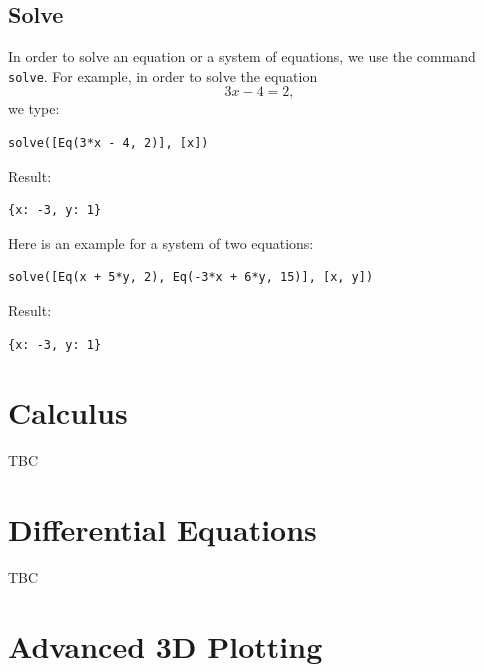 \documentclass[article,A4,12pt]{llncs}
\begin{document}
\subsection{Solve}

In order to solve an equation or a system of equations, we use the command {\tt solve}.
For example, in order to solve the equation 
$$
3x - 4 = 2,
$$
we type:
\begin{verbatim}
solve([Eq(3*x - 4, 2)], [x])
\end{verbatim}
Result:
\begin{verbatim}
{x: -3, y: 1}
\end{verbatim}
\noindent
Here is an example for a system of two equations:
\begin{verbatim}
solve([Eq(x + 5*y, 2), Eq(-3*x + 6*y, 15)], [x, y])
\end{verbatim}
Result:
\begin{verbatim}
{x: -3, y: 1}
\end{verbatim}
\noindent


\section{Calculus}

TBC



\section{Differential Equations}

TBC


\section{Advanced 3D Plotting}
\end{document}

